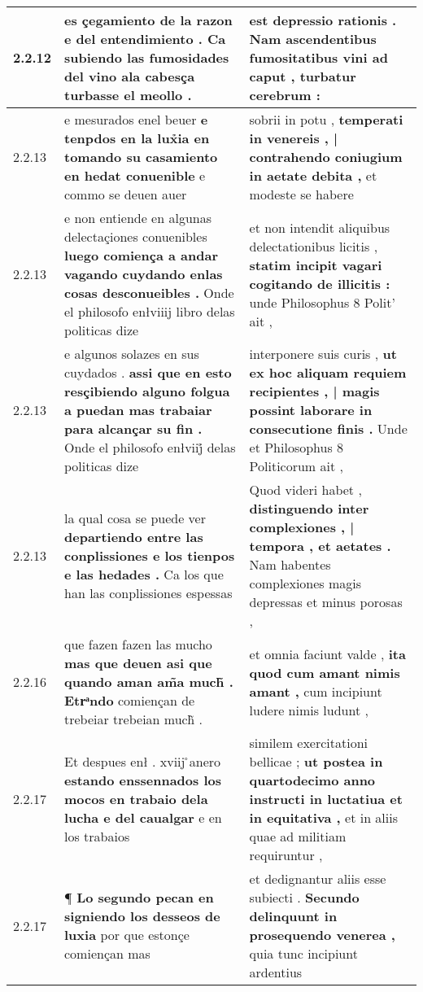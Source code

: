 \begin{tabular}{|p{1cm}|p{6.5cm}|p{6.5cm}|}
2.2.12 & es çegamiento de la razon e del entendimiento . \textbf{ Ca subiendo las fumosidades del vino } ala cabesça turbasse el meollo . & est depressio rationis . \textbf{ Nam ascendentibus fumositatibus vini ad caput , } turbatur cerebrum : \\\hline
2.2.13 & e mesurados enel beuer \textbf{ e tenpdos en la lux̉ia en tomando su casamiento en hedat conuenible } e commo se deuen auer & sobrii in potu , \textbf{ temperati in venereis , | contrahendo coniugium in aetate debita , } et modeste se habere \\\hline
2.2.13 & e non entiende en algunas delectaçiones conuenibles \textbf{ luego comiença a andar vagando cuydando enlas cosas desconueibles . } Onde el philosofo enłviiij libro delas politicas dize & et non intendit aliquibus delectationibus licitis , \textbf{ statim incipit vagari cogitando de illicitis : } unde Philosophus 8 Polit’ ait , \\\hline
2.2.13 & e algunos solazes en sus cuydados . \textbf{ assi que en esto resçibiendo alguno folgua a puedan mas trabaiar para alcançar su fin . } Onde el philosofo enłviij̊ delas politicas dize & interponere suis curis , \textbf{ ut ex hoc aliquam requiem recipientes , | magis possint laborare in consecutione finis . } Unde et Philosophus 8 Politicorum ait , \\\hline
2.2.13 & la qual cosa se puede ver \textbf{ departiendo entre las conplissiones e los tienpos e las hedades . } Ca los que han las conplissiones espessas & Quod videri habet , \textbf{ distinguendo inter complexiones , | tempora , et aetates . } Nam habentes complexiones magis depressas et minus porosas , \\\hline
2.2.16 & que fazen fazen las mucho \textbf{ mas que deuen asi que quando aman am̃a much̃ . Etrͣndo } comiençan de trebeiar trebeian much̃ . & et omnia faciunt valde , \textbf{ ita quod cum amant nimis amant , } cum incipiunt ludere nimis ludunt , \\\hline
2.2.17 & Et despues enł . xviij ̊anero \textbf{ estando enssennados los mocos en trabaio dela lucha e del caualgar } e en los trabaios & similem exercitationi bellicae ; \textbf{ ut postea in quartodecimo anno instructi in luctatiua et in equitativa , } et in aliis quae ad militiam requiruntur , \\\hline
2.2.17 & ¶ \textbf{ Lo segundo pecan en signiendo los desseos de luxia } por que estonçe comiençan mas & et dedignantur aliis esse subiecti . \textbf{ Secundo delinquunt in prosequendo venerea , } quia tunc incipiunt ardentius \\\hline

\end{tabular}
